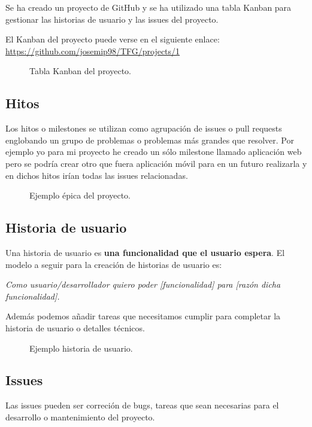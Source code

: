 Se ha creado un proyecto de GitHub y se ha utilizado una tabla Kanban para gestionar las historias de usuario y las issues del proyecto.

El Kanban del proyecto puede verse en el siguiente enlace:
\url{https://github.com/josemip98/TFG/projects/1}

\begin{figure}[H]
  \centering
  \noindent{}
  \caption{Tabla Kanban del proyecto.}
\end{figure}

\subsection{Hitos}

Los hitos o milestones se utilizan como agrupación de issues o pull requests englobando un grupo de problemas o problemas más grandes que resolver.
Por ejemplo yo para mi proyecto he creado un sólo milestone llamado aplicación web pero se podría crear otro que fuera aplicación móvil para en un futuro realizarla y en dichos hitos irían todas las issues relacionadas.

\begin{figure}[H]
	\centering
	\noindent{}
	\caption{Ejemplo épica del proyecto.}
  \end{figure}

\subsection{Historia de usuario}
Una historia de usuario es \textbf{una funcionalidad que el usuario espera}.
El modelo a seguir para la creación de historias de usuario es:

\textit{Como usuario/desarrollador quiero poder [funcionalidad] para [razón dicha funcionalidad].}

Además podemos añadir tareas que necesitamos cumplir para completar la historia de usuario o detalles técnicos.

\begin{figure}[H]
	\centering
	\noindent{}
	\caption{Ejemplo historia de usuario.}
  \end{figure}

\subsection{Issues}
Las issues pueden ser correción de bugs, tareas que sean necesarias para el desarrollo o mantenimiento del proyecto.

